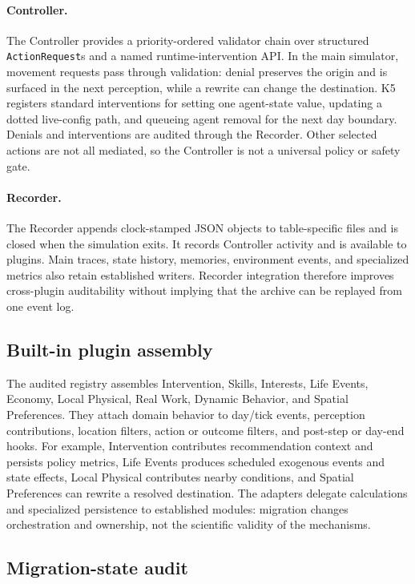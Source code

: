 \paragraph{Controller.}
The Controller provides a priority-ordered validator chain over structured
\texttt{ActionRequest}s and a named runtime-intervention API.  In the main
simulator, movement requests pass through validation: denial preserves the
origin and is surfaced in the next perception, while a rewrite can change the
destination.  K5 registers standard interventions for setting one agent-state
value, updating a dotted live-config path, and queueing agent removal for the
next day boundary.  Denials and interventions are audited through the
Recorder.  Other selected actions are not all mediated, so the Controller is
not a universal policy or safety gate.

\paragraph{Recorder.}
The Recorder appends clock-stamped JSON objects to table-specific files and is
closed when the simulation exits.  It records Controller activity and is
available to plugins.  Main traces, state history, memories, environment
events, and specialized metrics also retain established writers.  Recorder
integration therefore improves cross-plugin auditability without implying
that the archive can be replayed from one event log.

\subsection{Built-in plugin assembly}

The audited registry assembles Intervention, Skills, Interests, Life Events,
Economy, Local Physical, Real Work, Dynamic Behavior, and Spatial Preferences.
They attach domain behavior to day/tick events, perception contributions,
location filters, action or outcome filters, and post-step or day-end hooks.
For example, Intervention contributes recommendation context and persists
policy metrics, Life Events produces scheduled exogenous events and state
effects, Local Physical contributes nearby conditions, and Spatial Preferences
can rewrite a resolved destination.  The adapters delegate calculations and
specialized persistence to established modules: migration changes
orchestration and ownership, not the scientific validity of the mechanisms.

\subsection{Migration-state audit}

